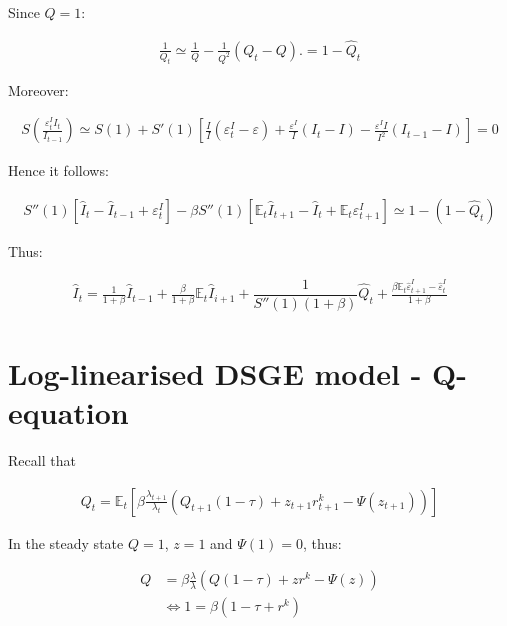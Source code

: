 \documentclass{pracamgr}
\numberwithin{equation}{section}
\begin{document}
Since $Q = 1$:

\begin{align}
\frac{1}{Q_{t}} \simeq \frac{1}{Q} - \frac{1}{Q^{2}} \left(Q_{t} - Q \right).= 1 - \hat{Q}_{t}
\end{align}

Moreover:

\begin{align}
S \left(\frac{\varepsilon_{t}^{I}I_{t}}{I_{t-1}} \right) \simeq S(1) + S'(1) \left[ \frac{I}{I} \left( \varepsilon_{t}^{I} - \varepsilon \right) + \frac{\varepsilon^{I}}{I} \left( I_{t}-I \right) - \frac{\varepsilon^{I}I}{I^{2}} \left( I_{t-1}-I \right) \right] = 0
\end{align}

Hence it follows:

\begin{align}
S''(1) \left[\hat{I}_{t} - \hat{I}_{t-1} + \varepsilon_{t}^{I} \right] - \beta S''(1) \left[\mathbb{E}_{t} \hat{I}_{t+1} - \hat{I}_{t} + \mathbb{E}_{t} \varepsilon_{t+1}^{I} \right] \simeq 1 - (1 - \hat{Q}_{t})
\end{align}

Thus:

\begin{align}
\hat{I}_{t} = \frac{1}{1+\beta} \hat{I}_{t-1} + \frac{\beta}{1+\beta} \mathbb{E}_{t} \hat{I}_{i+1} + \dfrac{1}{S''(1)(1+\beta)}\hat{Q}_{t} + \frac{\beta \mathbb{E}_{t} \hat{\varepsilon}_{t+1}^{I} - \hat{\varepsilon}_{t}^{I}}{1+\beta}
\end{align}

\section*{Log-linearised DSGE model - Q-equation}

Recall that 

\begin{align}
Q_{t} = \mathbb{E}_{t} \left[ \beta \frac{\lambda_{t+1}}{\lambda_{t}} \left( Q_{t+1}(1-\tau) + z_{t+1}r_{t+1}^{k} - \Psi(z_{t+1}) \right) \right] 
\end{align}

In the steady state $Q = 1$, $z = 1$ and $\Psi(1) = 0$, thus:

\begin{align}
Q &= \beta \frac{\lambda}{\lambda} \left( Q(1-\tau) + z r^{k} - \Psi(z) \right) \nonumber \\
& \iff 1 = \beta \left( 1 - \tau + r^{k} \right)
\end{align}
\end{document}
